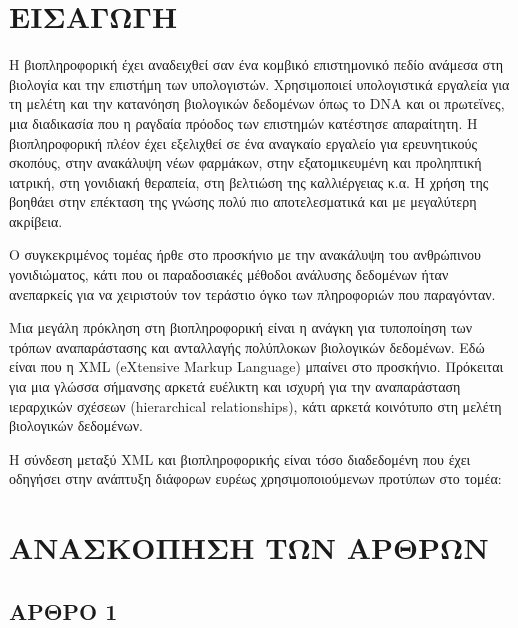 \chapter{ΕΙΣΑΓΩΓΗ}

    Η βιοπληροφορική έχει αναδειχθεί σαν ένα κομβικό επιστημονικό πεδίο ανάμεσα στη βιολογία και την επιστήμη των υπολογιστών.
    Χρησιμοποιεί υπολογιστικά εργαλεία για τη μελέτη και την κατανόηση βιολογικών δεδομένων όπως το DNA και οι πρωτεϊνες, μια διαδικασία που η ραγδαία πρόοδος των επιστημών κατέστησε απαραίτητη.
    Η βιοπληροφορική πλέον έχει εξελιχθεί σε ένα αναγκαίο εργαλείο για ερευνητικούς σκοπόυς, στην ανακάλυψη νέων φαρμάκων, στην εξατομικευμένη και προληπτική ιατρική, στη γονιδιακή θεραπεία, στη βελτιώση της καλλιέργειας κ.α.
    Η χρήση της βοηθάει στην επέκταση της γνώσης πολύ πιο αποτελεσματικά και με μεγαλύτερη ακρίβεια.

    Ο συγκεκριμένος τομέας ήρθε στο προσκήνιο με την ανακάλυψη του ανθρώπινου γονιδιώματος, κάτι που οι παραδοσιακές μέθοδοι ανάλυσης δεδομένων ήταν ανεπαρκείς για να χειριστούν τον τεράστιο όγκο των πληροφοριών που παραγόνταν.

    Μια μεγάλη πρόκληση στη βιοπληροφορική είναι η ανάγκη για τυποποίηση των τρόπων αναπαράστασης και ανταλλαγής πολύπλοκων βιολογικών δεδομένων.
    Εδώ είναι που η XML (eXtensive Markup Language) μπαίνει στο προσκήνιο.
    Πρόκειται για μια γλώσσα σήμανσης αρκετά ευέλικτη και ισχυρή για την αναπαράσταση ιεραρχικών σχέσεων (hierarchical relationships), κάτι αρκετά κοινότυπο στη μελέτη βιολογικών δεδομένων.

    Η σύνδεση μεταξύ XML και βιοπληροφορικής είναι τόσο διαδεδομένη που έχει οδηγήσει στην ανάπτυξη διάφορων ευρέως χρησιμοποιούμενων προτύπων στο τομέα:


\chapter{ΑΝΑΣΚΟΠΗΣΗ ΤΩΝ ΑΡΘΡΩΝ}
    
    \section{ΑΡΘΡΟ 1}
